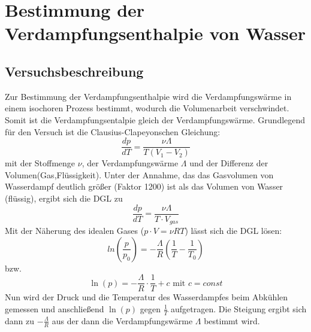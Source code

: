 \documentclass[10pt,a4paper]{article}
\author{Erik Zimmermann}
\begin{document}
\section{Bestimmung der Verdampfungsenthalpie von Wasser}
\subsection{Versuchsbeschreibung}
Zur Bestimmung der Verdampfungsenthalpie wird die Verdampfungswärme in einem isochoren Prozess bestimmt, wodurch die Volumenarbeit verschwindet. Somit ist die Verdampfungsentalpie gleich der Verdampfungswärme. Grundlegend für den Versuch ist die Clausius-Clapeyonschen Gleichung:
\begin{equation}
\frac{dp}{dT}=\frac{\nu \Lambda}{T(V_1-V_2)}
\end{equation}
mit der Stoffmenge $\nu$, der Verdampfungswärme $\Lambda$ und der Differenz der Volumen(Gas,Flüssigkeit).
Unter der Annahme, das das Gasvolumen von Wasserdampf deutlich größer (Faktor 1200) ist als das Volumen von Wasser (flüssig), ergibt sich die DGL zu
\begin{equation*}
\frac{dp}{dT}=\frac{\nu \Lambda}{T\cdot V_{gas}}
\end{equation*}
Mit der Näherung des idealen Gases ($p\cdot V=\nu R T$) lässt sich die DGL lösen:
\begin{equation}
ln(\frac{p}{p_0})=-\frac{\Lambda}{R}(\frac{1}{T}-\frac{1}{T_0})
\end{equation}
bzw.
\begin{equation}
\ln(p)=-\frac{\Lambda}{R}\cdot \frac{1}{T}+c \text{ mit } c=const
\end{equation}
Nun wird der Druck und die Temperatur des Wasserdampfes beim Abkühlen gemessen und anschließend $\ln(p)$ gegen $\frac{1}{T}$ aufgetragen. Die Steigung ergibt sich dann zu $-\frac{\Lambda}{R}$ aus der dann die Verdampfungswärme $\Lambda$ bestimmt wird.
\end{document}
